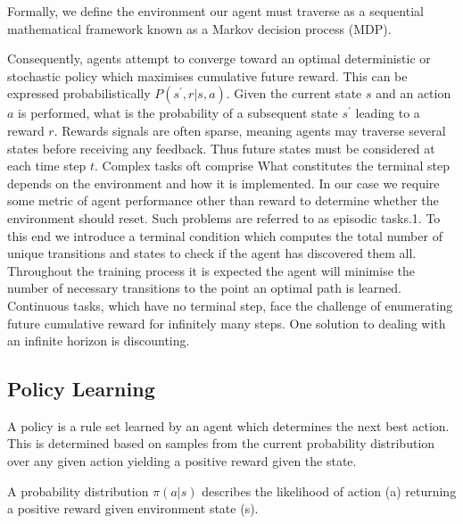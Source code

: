 \documentclass[runningheads]{llncs}
\begin{document}
Formally, we define the environment our agent must traverse as a sequential mathematical framework known
as a Markov decision process (MDP). 

Consequently, agents attempt to converge toward an optimal deterministic or stochastic policy which maximises cumulative future reward. This can be expressed probabilistically $P(s^{\prime},r|s,a)$. Given the current state $s$ and an action $a$ is performed, what is the probability of a subsequent state $s^{\prime}$ leading to a reward $r$. Rewards signals are often sparse, meaning agents may traverse several states before receiving any feedback. Thus future states must be considered at each time step $t$. Complex tasks oft comprise  What constitutes the terminal step depends on the environment and how it is implemented. In our case we require some metric of agent performance other than reward to determine whether the environment should reset. Such problems are referred to as episodic tasks.1. To this end we introduce a terminal condition which computes the total
number of unique transitions and states to check if the agent has discovered them all.
Throughout the training process it is expected the agent will minimise the number of
necessary transitions to the point an optimal path is learned. Continuous tasks, which
have no terminal step, face the challenge of enumerating future cumulative reward for
infinitely many steps. One solution to dealing with an infinite horizon is discounting.

\subsection{Policy Learning}
A policy is a rule set learned by an agent which determines the next best action. This is determined based on samples from the current probability distribution over any given action yielding a positive reward given the state.

\begin{definition}[Policy]A probability distribution $\pi(a|s)$ describes the likelihood of action (a) returning a positive reward given environment state (s).
\end{definition}
\end{document}
